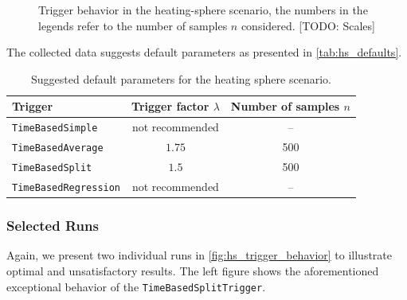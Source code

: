 \begin{figure}[htpb]
\begin{subfigure}{0.45\textwidth}
	\end{subfigure}%
	\caption{Trigger behavior in the heating-sphere scenario, the numbers in the legends refer to the number of samples $n$ considered. [TODO: Scales]}
	\label{fig:params_hs}
\end{figure}

The collected data suggests default parameters as presented in \autoref{tab:hs_defaults}.
\begin{table}[htpb]
	\centering
	\begin{tabular}{lcc}
		\toprule
		\textbf{Trigger}             & \textbf{Trigger factor $\lambda$} & \textbf{Number of samples $n$} \\ [0em]
		\midrule
		\texttt{TimeBasedSimple}     & not recommended                   & --                             \\
		\texttt{TimeBasedAverage}    & $1.75$                            & 500                            \\
		\texttt{TimeBasedSplit}      & $1.5$                             & 500                            \\
		\texttt{TimeBasedRegression} & not recommended                   & --                             \\
		\bottomrule
	\end{tabular}
	\caption{Suggested default parameters for the heating sphere scenario.}
	\label{tab:hs_defaults}
\end{table}

\subsubsection{Selected Runs}
Again, we present two individual runs in \autoref{fig:hs_trigger_behavior} to illustrate optimal and unsatisfactory results. The left figure shows the aforementioned exceptional behavior of the \texttt{TimeBasedSplitTrigger}. %

